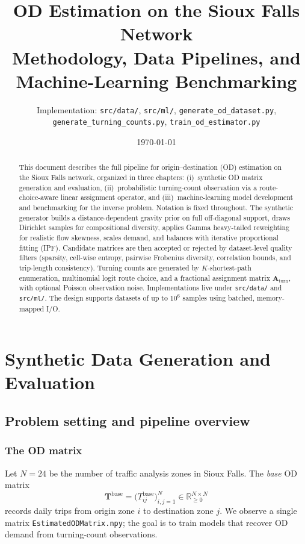 \documentclass[11pt,a4paper]{report}
\title{OD Estimation on the Sioux Falls Network\\[0.4em]
\large Methodology, Data Pipelines, and Machine-Learning Benchmarking}
\author{Implementation: \texttt{src/data/}, \texttt{src/ml/}, \texttt{generate\_od\_dataset.py}, \texttt{generate\_turning\_counts.py}, \texttt{train\_od\_estimator.py}}
\date{\today}
\newcommand{\Tbase}{\mathbf{T}^{\mathrm{base}}}
\newcommand{\Aturn}{\mathbf{A}_{\mathrm{turn}}}
\begin{document}
\maketitle

\begin{abstract}
This document describes the full pipeline for origin--destination (OD) estimation on the Sioux Falls network, organized in three chapters: (i)~synthetic OD matrix generation and evaluation, (ii)~probabilistic turning-count observation via a route-choice-aware linear assignment operator, and (iii)~machine-learning model development and benchmarking for the inverse problem. Notation is fixed throughout. The synthetic generator builds a distance-dependent gravity prior on full off-diagonal support, draws Dirichlet samples for compositional diversity, applies Gamma heavy-tailed reweighting for realistic flow skewness, scales demand, and balances with iterative proportional fitting (IPF). Candidate matrices are then accepted or rejected by dataset-level quality filters (sparsity, cell-wise entropy, pairwise Frobenius diversity, correlation bounds, and trip-length consistency). Turning counts are generated by $K$-shortest-path enumeration, multinomial logit route choice, and a fractional assignment matrix $\Aturn$, with optional Poisson observation noise. Implementations live under \texttt{src/data/} and \texttt{src/ml/}. The design supports datasets of up to $10^6$ samples using batched, memory-mapped I/O.
\end{abstract}

\tableofcontents
\newpage

\chapter{Synthetic Data Generation and Evaluation}
\label{ch:synthetic}

\section{Problem setting and pipeline overview}
\label{sec:ch1-problem}

\subsection{The OD matrix}

Let $N=24$ be the number of traffic analysis zones in Sioux Falls. The \emph{base} OD matrix
\begin{equation}
    \Tbase = \bigl(T^{\mathrm{base}}_{ij}\bigr)_{i,j=1}^{N} \in \mathbb{R}_{\ge 0}^{N \times N}
\end{equation}
records daily trips from origin zone $i$ to destination zone $j$. We observe a single matrix \texttt{EstimatedODMatrix.npy}; the goal is to train models that recover OD demand from turning-count observations.
\end{document}
